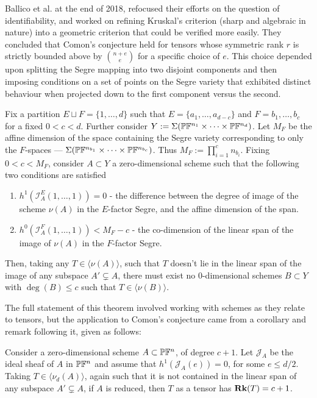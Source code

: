 \documentclass[../Lael_John_MasterThesis_Draft.tex]{subfiles}
\begin{document}
 Ballico et al. \cite{ballico_bounds_2018} at the end of 2018, refocused their efforts on the question of identifiability, and worked on refining Kruskal's criterion (sharp and algebraic in nature) into a geometric criterion that could be verified more easily. They concluded that Comon's conjecture held for tensors whose symmetric rank $r$ is strictly bounded above by $\binom{n+e}{e}$ for a specific choice of $e$. This choice depended upon splitting the Segre mapping into two disjoint components and then imposing conditions on a set of points on the Segre variety that exhibited distinct behaviour when projected down to the first component versus the second.
\begin{theorem}
	Fix a partition $E \sqcup F = \{1, \ldots, d\}$ such that $E = \{a_1, \ldots, a_{d-c}\}$ and $F = {b_1, \ldots, b_c}$ for a fixed $0 < c < d$. Further consider $Y:= \Sigma(\mathbb{P} \mathbb{F}^{n_1} \times \cdots \times \mathbb{P} \mathbb{F}^{n_d})$. Let $M_F$ be the affine dimension of the space containing the Segre variety corresponding to only the $F$-spaces --- $\Sigma(\mathbb{P}\mathbb{F}^{n_{b_1}} \times \cdots \times \mathbb{P}\mathbb{F}^{n_{b_c}})$. Thus $M_F := \prod_{i=1}^{c} n_{b_i}$. Fixing $0 < c < M_F$, consider $A \subset Y$ a zero-dimensional scheme such that the following two conditions are satisfied \begin{enumerate}
		\item $h^1(\mathcal{I}_A^E(1,\ldots,1)) = 0$ - the difference between the degree of image of the scheme $\nu(A)$ in the $E$-factor Segre, and the affine dimension of the span.
		\item $h^0(\mathcal{I}_A^F(1, \ldots,1)) < M_F - c$ - the co-dimension of the linear span of the image of $\nu(A)$ in the $F$-factor Segre.
	\end{enumerate}
	Then, taking any $T \in \langle \nu(A) \rangle$, such that $T$ doesn't lie in the linear span of the image of any subspace $A' \subsetneq A$, there must exist no $0$-dimensional schemes $B \subset Y$ with $\deg(B) \leq c$ such that $T \in \langle \nu(B) \rangle$.
\end{theorem}
The full statement of this theorem involved working with schemes as they relate to tensors, but the application to Comon's conjecture came from a corollary and remark following it, given as follows:
\begin{corollary}
	Consider a zero-dimensional scheme $A \subset \mathbb{P}\mathbb{F}^n$, of degree $c + 1$. Let $\mathcal{J}_A$ be the ideal sheaf of $A$ in $\mathbb{P}\mathbb{F}^n$ and assume that $h^1(\mathcal{J}_A(e)) =0$, for some $e \leq d/2$. Taking $T\in \langle \nu_d(A) \rangle$, again such that it is not contained in the linear span of any subspace $A' \subsetneq A$, if $A$ is reduced, then $T$ as a tensor has $\textbf{Rk}(T) = c+1$.
\end{corollary}
\end{document}
